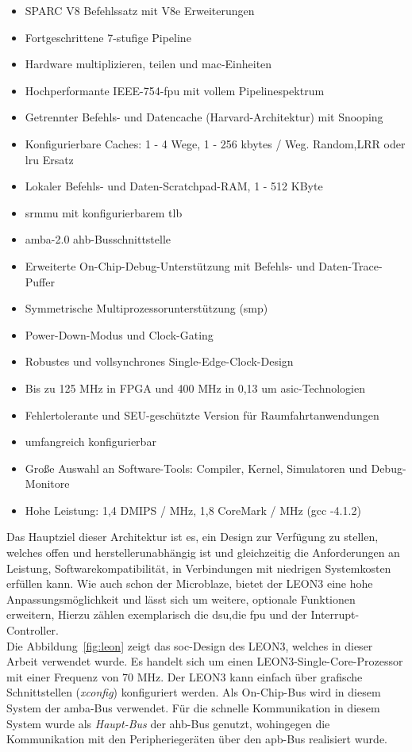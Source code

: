 \begin{itemize}
  \item SPARC V8 Befehlssatz mit V8e Erweiterungen
\item Fortgeschrittene 7-stufige Pipeline
\item Hardware multiplizieren, teilen und \ac{mac}-Einheiten
\item Hochperformante IEEE-754-\ac{fpu} mit vollem Pipelinespektrum
\item Getrennter Befehls- und Datencache (Harvard-Architektur) mit Snooping
\item Konfigurierbare Caches: 1 - 4 Wege, 1 - 256 kbytes / Weg. Random,LRR oder \ac{lru} Ersatz
\item Lokaler Befehls- und Daten-Scratchpad-RAM, 1 - 512 KByte
\item \ac{srmmu} mit konfigurierbarem \ac{tlb}
\item \ac{amba}-2.0 \ac{ahb}-Busschnittstelle
\item Erweiterte On-Chip-Debug-Unterstützung mit Befehls- und Daten-Trace-Puffer
\item Symmetrische Multiprozessorunterstützung (\ac{smp})
\item Power-Down-Modus und Clock-Gating
\item Robustes und vollsynchrones Single-Edge-Clock-Design
\item Bis zu 125 MHz in FPGA und 400 MHz in 0,13 um \ac{asic}-Technologien
\item Fehlertolerante und SEU-geschützte Version für Raumfahrtanwendungen
\item umfangreich konfigurierbar
\item Große Auswahl an Software-Tools: Compiler, Kernel, Simulatoren und Debug-Monitore
\item Hohe Leistung: 1,4 DMIPS / MHz, 1,8 CoreMark / MHz (gcc -4.1.2)
\end{itemize}

Das Hauptziel dieser Architektur ist es, ein Design zur Verfügung zu stellen, welches offen und herstellerunabhängig ist und gleichzeitig die Anforderungen an Leistung, Softwarekompatibilität,
in Verbindungen mit niedrigen Systemkosten erfüllen kann. Wie auch schon der Microblaze, bietet der LEON3 eine hohe Anpassungsmöglichkeit und lässt sich um weitere, optionale Funktionen erweitern,
Hierzu zählen exemplarisch die \ac{dsu},die  \ac{fpu} und der Interrupt-Controller.\\
Die Abbildung~\ref{fig:leon} zeigt das \ac{soc}-Design des LEON3, welches in dieser Arbeit verwendet wurde. Es handelt sich um einen LEON3-Single-Core-Prozessor mit einer Frequenz von
70 MHz. Der LEON3 kann einfach über grafische Schnittstellen (\emph{xconfig}) konfiguriert werden. Als On-Chip-Bus wird in diesem System der \ac{amba}-Bus verwendet.
Für die schnelle Kommunikation in diesem System wurde als \emph{Haupt-Bus} der \ac{ahb}-Bus genutzt, wohingegen die Kommunikation mit den Peripheriegeräten über den \ac{apb}-Bus realisiert wurde.\\


